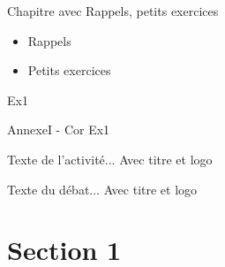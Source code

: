 \documentclass[nocrop]{sesamanuel}
\begin{document}
%

\begin{prerequis}[Prérequis - G1]
  Chapitre avec Rappels, petits exercices  
  \begin{itemize}
  \item Rappels
  \item Petits exercices
  \end{itemize}
\end{prerequis}

\begin{autoeval}  
    \begin{exercice}
      Ex1
    \end{exercice}
    \begin{corrige}
      AnnexeI - Cor Ex1
    \end{corrige}
\end{autoeval}

\activites
\begin{activite}
  Texte de l’activité... Avec titre et logo
\end{activite}
\begin{debat}
  Texte du débat... Avec titre et logo
\end{debat}

\cours
\section{Section 1}
\end{document}
